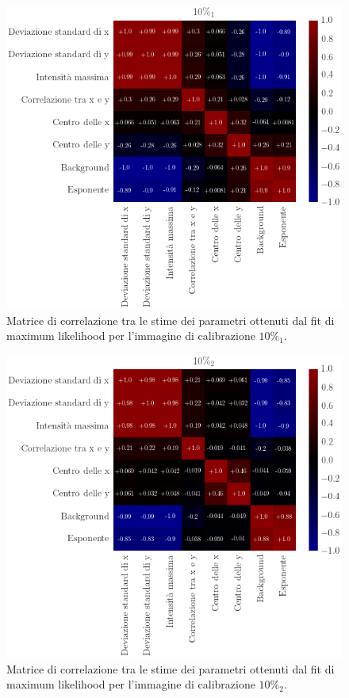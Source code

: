 \begin{figure}
 \centering
 \includegraphics[scale=.48]{img/CAP4c1.png}
 \caption{\small{Matrice di correlazione tra le stime dei parametri ottenuti dal fit di maximum likelihood per l'immagine di calibrazione $10\%_1$.}}
 \label{fig:c1}
\end{figure}

\begin{figure}
 \centering
 \includegraphics[scale=.48]{img/CAP4c2.png}
 \caption{\small{Matrice di correlazione tra le stime dei parametri ottenuti dal fit di maximum likelihood per l'immagine di calibrazione $10\%_2$.}}
 \label{fig:c2}
\end{figure}

